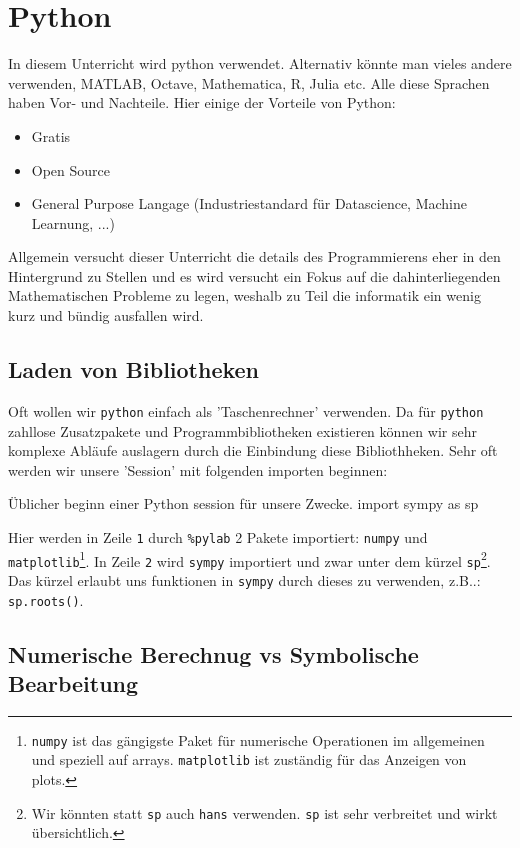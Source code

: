 \section{Python}\label{sec:python}

In diesem Unterricht wird python verwendet. Alternativ könnte man vieles andere verwenden, MATLAB, Octave,  Mathematica, R, Julia etc. Alle diese Sprachen haben Vor- und Nachteile. Hier einige der Vorteile von Python:
\begin{itemize}
	\item Gratis
	\item Open Source
	\item General Purpose Langage (Industriestandard für Datascience, Machine Learnung, ...) 
\end{itemize}
Allgemein versucht dieser Unterricht die details des Programmierens eher in den Hintergrund zu Stellen und es wird versucht ein Fokus auf die dahinterliegenden Mathematischen Probleme zu legen, weshalb zu Teil die informatik ein wenig kurz und bündig ausfallen wird. 

\subsection{Laden von Bibliotheken}
Oft wollen wir \texttt{python} einfach als 'Taschenrechner' verwenden. Da für \texttt{python} zahllose Zusatzpakete und Programmbibliotheken existieren können wir sehr komplexe Abläufe auslagern durch die Einbindung diese Bibliothheken. Sehr oft werden wir unsere 'Session' mit folgenden importen beginnen:

\begin{python}{Üblicher beginn einer Python session für unsere Zwecke.}
import sympy as sp
\end{python}
Hier werden in Zeile \texttt{1} durch \texttt{\%pylab} 2 Pakete importiert: \texttt{numpy} und \texttt{matplotlib}\footnote{\texttt{numpy} ist das gängigste Paket für numerische Operationen im allgemeinen und speziell auf arrays. \texttt{matplotlib} ist zuständig für das Anzeigen von plots.}. In Zeile \texttt{2} wird \texttt{sympy} importiert und zwar unter dem kürzel \texttt{sp}\footnote{Wir könnten statt \texttt{sp} auch \texttt{hans} verwenden. \texttt{sp} ist sehr verbreitet und wirkt übersichtlich.}. Das kürzel erlaubt uns funktionen in \texttt{sympy} durch dieses zu verwenden, z.B..: \texttt{sp.roots()}. \\


\subsection{Numerische Berechnug vs Symbolische Bearbeitung}

